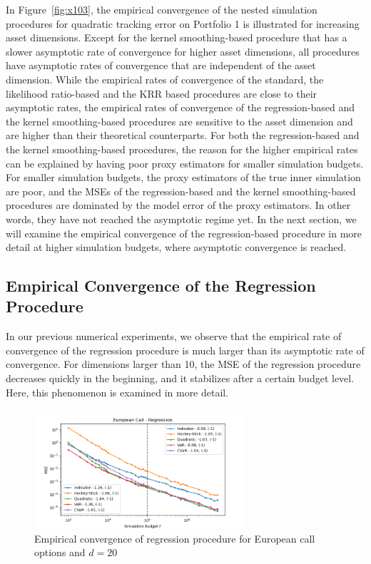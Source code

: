 \documentclass{article}
\begin{document}
In Figure~\ref{fig:x103}, the empirical convergence of the nested simulation procedures for quadratic tracking error on Portfolio 1 is illustrated for increasing asset dimensions.
Except for the kernel smoothing-based procedure that has a slower asymptotic rate of convergence for higher asset dimensions, all procedures have asymptotic rates of convergence that are independent of the asset dimension.
While the empirical rates of convergence of the standard, the likelihood ratio-based and the KRR based procedures are close to their asymptotic rates, the empirical rates of convergence of the regression-based and the kernel smoothing-based procedures are sensitive to the asset dimension and are higher than their theoretical counterparts.
For both the regression-based and the kernel smoothing-based procedures, the reason for the higher empirical rates can be explained by having poor proxy estimators for smaller simulation budgets.
For smaller simulation budgets, the proxy estimators of the true inner simulation are poor, and the MSEs of the regression-based and the kernel smoothing-based procedures are dominated by the model error of the proxy estimators.
In other words, they have not reached the asymptotic regime yet.
In the next section, we will examine the empirical convergence of the regression-based procedure in more detail at higher simulation budgets, where asymptotic convergence is reached.

\subsection{Empirical Convergence of the Regression Procedure} \label{sec:regression-convergence}

In our previous numerical experiments, we observe that the empirical rate of convergence of the regression procedure is much larger than its asymptotic rate of convergence.
For dimensions larger than 10, the MSE of the regression procedure decreases quickly in the beginning, and it stabilizes after a certain budget level.
Here, this phenomenon is examined in more detail. 

\begin{figure}[ht]
    \centering
    \includegraphics[width=0.7\textwidth]{./figures/convergence/European Call-Regression_largeBudget.png}
    \caption{Empirical convergence of regression procedure for European call options and $d=20$}
    \label{fig:reg_lb} 
\end{figure}
\end{document}
